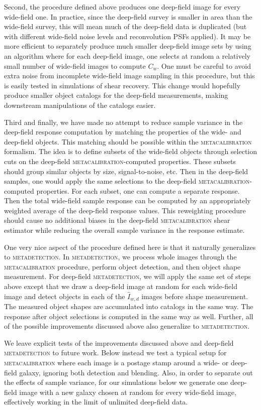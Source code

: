 \documentclass[twocolumn]{openjournal}
\makeatletter
\newcommand{\mdet}{\textsc{metadetection}\@\xspace}
\newcommand{\mcal}{\textsc{metacalibration}\@\xspace}
\makeatother
\begin{document}
Second, the procedure defined above produces one deep-field image for every wide-field
one. In practice, since the deep-field survey is smaller in area than the wide-field
survey, this will mean much of the deep-field data is duplicated (but with different
wide-field noise levels and reconvolution PSFs applied). It may be more efficient to
separately produce much smaller deep-field image sets by using an algorithm where for
each deep-field image, one selects at random a relatively small number of wide-field
images to compute $C_{w}$. One must be careful to avoid extra noise from incomplete
wide-field image sampling in this procedure, but this is easily tested in simulations of
shear recovery. This change would hopefully produce smaller object catalogs for the
deep-field measurements, making downstream manipulations of the catalogs easier.

Third and finally, we have made no attempt to reduce sample variance in the deep-field
response computation by matching the properties of the wide- and deep-field objects.
This matching should be possible within the \mcal formalism. The idea is to define
subsets of the wide-field objects through selection cuts on the deep-field
\mcal-computed properties. These subsets should group similar objects by size,
signal-to-noise, etc. Then in the deep-field samples, one would apply the same
selections to the deep-field \mcal-computed properties. For each subset, one can compute
a separate response. Then the total wide-field sample response can be computed by an
appropriately weighted average of the deep-field response values. This reweighting
procedure should cause no additional biases in the deep-field \mcal shear estimator
while reducing the overall sample variance in the response estimate.

One very nice aspect of the procedure defined here is that it naturally generalizes to
\mdet. In \mdet, we process whole images through the \mcal procedure, perform object
detection, and then object shape measurement. For deep-field \mdet, we will apply the
same set of steps above except that we draw a deep-field image at random for each
wide-field image and detect objects in each of the $\hat I_{w,d}$ images before shape
measurement. The measured object shapes are accumulated into catalogs in the same way.
The response after object selections is computed in the same way as well. Further, all
of the possible improvements discussed above also generalize to \mdet.

We leave explicit tests of the improvements discussed above and deep-field \mdet to
future work. Below instead we test a typical setup for \mcal where each image is a
postage stamp around a wide- or deep-field galaxy, ignoring both detection and blending.
Also, in order to separate out the effects of sample variance, for our simulations below
we generate one deep-field image with a new galaxy chosen at random for every wide-field
image, effectively working in the limit of unlimited deep-field data.
\end{document}

